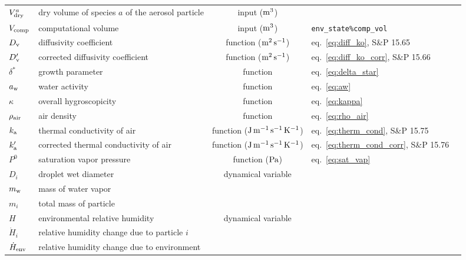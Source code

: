 \documentclass{article}
\begin{document}
\begin{tabular}{lp{4cm}clp{3cm}}
$V^a_{\rm dry}$       & dry volume of species $a$ of the aerosol particle   & input ($\rm m^3$) &    \\
$V_{\rm comp}$ & computational volume & input ($\rm m^3$) & \verb+env_state%comp_vol+\\
\hline
$D_{\rm v}$     & diffusivity coefficient  &  function ($\rm m^2\, s^{-1}$) & eq.~\ref{eq:diff_ko}, S\&P 15.65  \\
$D_{\rm v}'$     & corrected diffusivity coefficient   &  function ($\rm m^2\, s^{-1}$) & eq.~\ref{eq:diff_ko_corr}, S\&P 15.66  \\
$\delta^*$  & growth parameter & function & eq.~\ref{eq:delta_star}\\
$a_{\rm w}$  & water activity  & function & eq.~\ref{eq:aw}   \\
$\kappa$      &  overall hygroscopicity   &  function &  eq.~\ref{eq:kappa}  \\
$\rho_{\rm air}$    &  air density   &  function &  eq.~\ref{eq:rho_air}  \\
$k_{\rm a}$     & thermal conductivity of air   &  function ($\rm J\,m^{-1}\, s^{-1} \, K^{-1}$) &  eq.~\ref{eq:therm_cond}, S\&P 15.75   \\
$k_{\rm a}'$    & corrected thermal conductivity of air   &  function ($\rm J\,m^{-1}\, s^{-1} \, K^{-1}$) &  eq.~\ref{eq:therm_cond_corr}, S\&P 15.76   \\
$P^0$   & saturation vapor pressure &  function ($\rm Pa$) & eq.~\ref{eq:sat_vap}  \\
$D_i$     &  droplet wet diameter  & dynamical variable  &     \\
$m_{\rm  w}$ & mass of water vapor & \\
$m_{i}$ & total mass of particle & \\
$H$     &  environmental relative humidity  &  dynamical variable &  \\
$\dot{H}_i$    & relative humidity change due to particle $i$ &  &  \\
$\dot{H}_{\rm env}$     & relative humidity change due to environment &  &  \\
\hline 
\end{tabular}

\newpage
\end{document}
